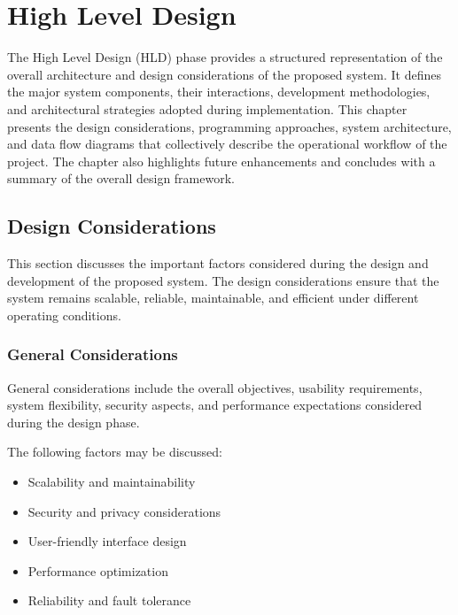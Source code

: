 \chapter{High Level Design}

The High Level Design (HLD) phase provides a structured representation of the overall architecture and design considerations of the proposed system. It defines the major system components, their interactions, development methodologies, and architectural strategies adopted during implementation. This chapter presents the design considerations, programming approaches, system architecture, and data flow diagrams that collectively describe the operational workflow of the project. The chapter also highlights future enhancements and concludes with a summary of the overall design framework.


\section{Design Considerations}

This section discusses the important factors considered during the design and development of the proposed system. The design considerations ensure that the system remains scalable, reliable, maintainable, and efficient under different operating conditions.


\subsection{General Considerations}

General considerations include the overall objectives, usability requirements, system flexibility, security aspects, and performance expectations considered during the design phase.

The following factors may be discussed:
\begin{itemize}
    \item Scalability and maintainability
    \item Security and privacy considerations
    \item User-friendly interface design
    \item Performance optimization
    \item Reliability and fault tolerance
\end{itemize}

